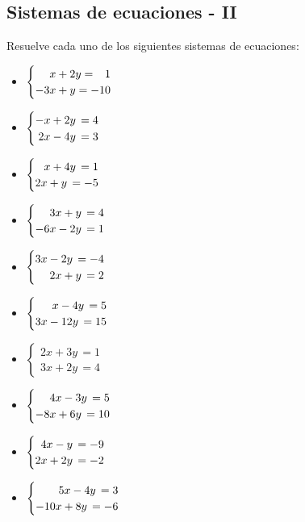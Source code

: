 \documentclass[11pt, twocolumn, landscape, a4paper]{article}
\begin{document}
\subsection*{Sistemas de ecuaciones - II}
Resuelve cada uno de los siguientes sistemas de ecuaciones: %
\begin{itemize}
\item{$\begin{cases} \hfill x + 2y = \phantom{-}1 \\ -3x + y = -10 \end{cases}$}

\item{$\begin{cases} -x + 2y \,= 4 \\ \hfill 2x - 4y \,= 3 \end{cases}$}

\item{$\begin{cases} \hfill x + 4y \,= 1 \\ 2x + y \,= -5 \end{cases}$}

\item{$\begin{cases} \hfill 3x + y \,= 4 \\ -6x - 2y \,= 1 \end{cases}$}

\item{$\begin{cases} 3x - 2y \,= -4 \\ \hfill 2x + y \,= 2 \end{cases}$}

\item{$\begin{cases} \hfill x - 4y \,= 5 \\ 3x - 12y \,= 15 \end{cases}$}

\item{$\begin{cases} 2x + 3y \,= 1 \\ 3x + 2y \,= 4 \end{cases}$}

\item{$\begin{cases} \hfill 4x - 3y \,= 5 \\ -8x + 6y \,= 10 \end{cases}$}

\item{$\begin{cases} \hfill 4x - y \,= -9 \\ 2x + 2y \,= -2 \end{cases}$}

\item{$\begin{cases} \hfill 5x - 4y \,= 3 \\ -10x + 8y \,= -6 \end{cases}$}
\end{itemize}
\end{document}
